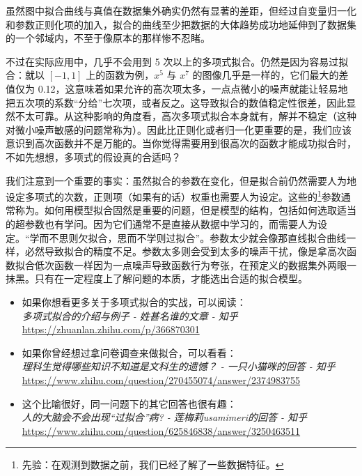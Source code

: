 虽然图中拟合曲线与真值在数据集外确实仍然有显著的差距，但经过自变量归一化和参数正则化项的加入，拟合的曲线至少把数据的大体趋势成功地延伸到了数据集的一个邻域内，不至于像原本的那样惨不忍睹。

不过在实际应用中，几乎不会用到 5 次以上的多项式拟合。仍然是因为容易过拟合：就以 $[-1, 1]$ 上的函数为例，$x^5$ 与 $x^7$ 的图像几乎是一样的，它们最大的差值仅为 0.12，这意味着如果允许的高次项太多，一点点微小的噪声就能让轻易地把五次项的系数“分给”七次项，或者反之。这导致拟合的数值稳定性很差，因此显然不太可靠。从这种影响的角度看，高次多项式拟合本身就有，解并不稳定（这种对微小噪声敏感的问题常称为）。因此比正则化或者归一化更重要的是，我们应该意识到高次函数并不是万能的。当你觉得需要用到很高次的函数才能成功拟合时，不如先想想，多项式的假设真的合适吗？

我们注意到一个重要的事实：虽然拟合的参数在变化，但是拟合前仍然需要人为地设定多项式的次数，正则项（如果有的话）权重也需要人为设定。这些的\footnote{先验：在观测到数据之前，我们已经了解了一些数据特征。}参数通常称为。如何用模型拟合固然是重要的问题，但是模型的结构，包括如何选取适当的超参数也有学问。因为它们通常不是直接从数据中学习的，而需要人为设定。“学而不思则欠拟合，思而不学则过拟合”。参数太少就会像那直线拟合曲线一样，必然导致拟合的精度不足。参数太多则会受到太多的噪声干扰，像是拿高次函数拟合低次函数一样因为一点噪声导致函数行为夸张，在预定义的数据集外两眼一抹黑。只有在一定程度上了解问题的本质，才能选出合适的拟合模型。

\begin{tcolorbox}[myrecommendbox, title=推荐阅读, breakable=false]
    \begin{itemize}
        \item 如果你想看更多关于多项式拟合的实战，可以阅读：\\
              \textit{多项式拟合的介绍与例子 - 姓甚名谁的文章 - 知乎}\\
              \url{https://zhuanlan.zhihu.com/p/366870301}
        \item 如果你曾经想过拿问卷调查来做拟合，可以看看：\\
              \textit{理科生觉得哪些知识不知道是文科生的遗憾？ - 一只小猫咪的回答 - 知乎}\\
              \url{https://www.zhihu.com/question/270455074/answer/2374983755}
        \item 这个比喻很好，同一问题下的其它回答也很有趣：\\
              \textit{人的大脑会不会出现“过拟合”病? - 莲梅莉usamimeri的回答 - 知乎}\\
              \url{https://www.zhihu.com/question/625846838/answer/3250463511}
    \end{itemize}
\end{tcolorbox}

